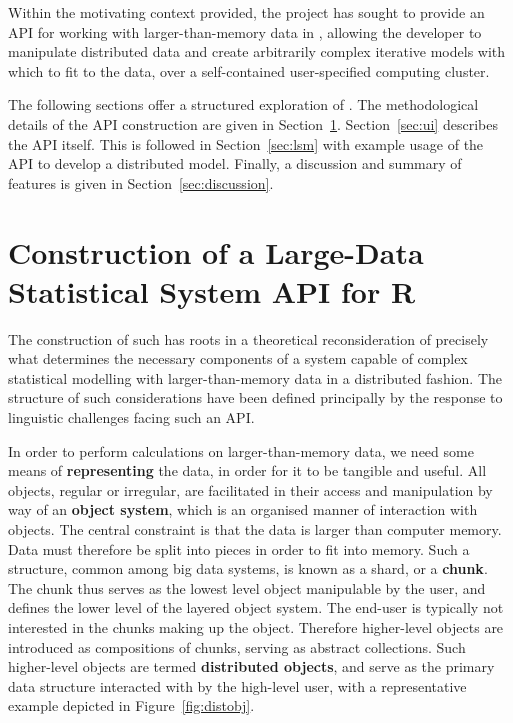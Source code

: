 \documentclass[letterpaper, inpress]{jds} %
\begin{document}
Within the motivating context provided, the  project has sought to provide an API for working with larger-than-memory data in , allowing the developer to manipulate distributed data and create arbitrarily complex iterative models with which to fit to the data, over a self-contained user-specified computing cluster. 

The following sections offer a structured exploration of .
The methodological details of the  API construction are given in Section~\ref{sec:construct}.
Section~\ref{sec:ui} describes the API itself.
This is followed in Section~\ref{sec:lsm} with example usage of the API to develop a distributed model.
Finally, a discussion and summary of features is given in Section~\ref{sec:discussion}.

\section{Construction of a Large-Data Statistical System API for R}\label{sec:construct}

The construction of such  has roots in a theoretical reconsideration of precisely what determines the necessary components of a system capable of complex statistical modelling with larger-than-memory data in a distributed fashion.
The structure of such considerations have been defined principally by the response to linguistic challenges facing such an API.

In order to perform calculations on larger-than-memory data, we need some means of \textbf{representing} the data, in order for it to be tangible and useful.
All objects, regular or irregular, are facilitated in their access and manipulation by way of an \textbf{object system}, which is an organised manner of interaction with objects.
The central constraint is that the data is larger than computer memory.
Data must therefore be split into pieces in order to fit into memory.
Such a structure, common among big data systems, is known as a shard, or a \textbf{chunk}. 
The chunk thus serves as the lowest level object manipulable by the user, and defines the lower level of the layered object system.
The end-user is typically not interested in the chunks making up the object.
Therefore higher-level objects are introduced as compositions of chunks, serving as abstract collections.
Such higher-level objects are termed \textbf{distributed objects}, and serve as the primary data structure interacted with by the high-level user, with a representative example depicted in Figure~\ref{fig:distobj}.
\end{document}
